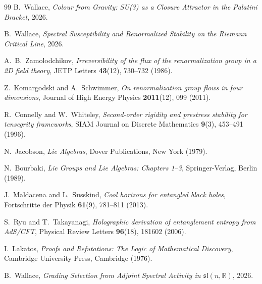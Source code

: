 \documentclass[11pt,a4paper]{article}
\theoremstyle{plain}
\theoremstyle{definition}
\theoremstyle{remark}
\begin{document}
\begin{thebibliography}{99}
B.~Wallace,
\textit{Colour from Gravity: SU(3) as a Closure Attractor in the Palatini Bracket},
2026.

B.~Wallace,
\textit{Spectral Susceptibility and Renormalized Stability on the Riemann Critical Line},
2026.

A.~B.~Zamolodchikov,
\textit{Irreversibility of the flux of the renormalization group in a 2D field theory},
JETP Letters \textbf{43}(12), 730--732 (1986).

Z.~Komargodski and A.~Schwimmer,
\textit{On renormalization group flows in four dimensions},
Journal of High Energy Physics \textbf{2011}(12), 099 (2011).

R.~Connelly and W.~Whiteley,
\textit{Second-order rigidity and prestress stability for tensegrity frameworks},
SIAM Journal on Discrete Mathematics \textbf{9}(3), 453--491 (1996).

N.~Jacobson,
\textit{Lie Algebras},
Dover Publications, New York (1979).

N.~Bourbaki,
\textit{Lie Groups and Lie Algebras: Chapters 1--3},
Springer-Verlag, Berlin (1989).

J.~Maldacena and L.~Susskind,
\textit{Cool horizons for entangled black holes},
Fortschritte der Physik \textbf{61}(9), 781--811 (2013).

S.~Ryu and T.~Takayanagi,
\textit{Holographic derivation of entanglement entropy from AdS/CFT},
Physical Review Letters \textbf{96}(18), 181602 (2006).

I.~Lakatos,
\textit{Proofs and Refutations: The Logic of Mathematical Discovery},
Cambridge University Press, Cambridge (1976).

B.~Wallace,
\textit{Grading Selection from Adjoint Spectral Activity
in $\mathfrak{sl}(n,\mathbb{R})$},
2026.

\end{thebibliography}
\end{document}
